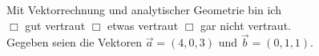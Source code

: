 \documentclass[12pt]{exam}
\begin{document}
\begin{questions}
%
%
%
%
%
%
%
%
%
%
%
%
%
%
%
\pagebreak
{}

Mit Vektorrechnung und analytischer Geometrie bin ich\\ $\Box$ gut vertraut \hfill $\Box$ etwas vertraut \hfill $\Box$ gar nicht vertraut. \\[2ex]
Gegeben seien die Vektoren $\vec{a}=(4,0,3)$ und $\vec{b}=(0,1,1)$.

\end{questions}
\end{document}
